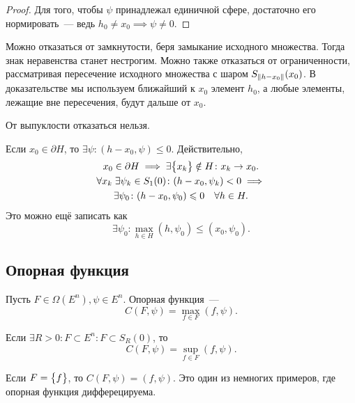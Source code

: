 \begin{proof}
    Для того, чтобы $\psi$ принадлежал единичной сфере, достаточно его нормировать~--- ведь $h_0 \neq x_0 \implies \psi \neq 0$.
\end{proof}

Можно отказаться от замкнутости, беря замыкание исходного множества.
Тогда знак неравенства станет нестрогим.
Можно также отказаться от ограниченности, рассматривая пересечение исходного множества с шаром $S_{\lVert h - x_0 \rVert}(x_0)$.
В доказательстве мы используем ближайший к $x_0$ элемент $h_0$, а любые элементы, лежащие вне пересечения, будут дальше от $x_0$.

От выпуклости отказаться нельзя.

Если $x_0 \in \partial H$, то $\exists \psi\colon (h - x_0, \psi) \leqslant 0$.
Действительно,
\begin{gather*}
    x_0 \in \partial H \implies \exists \bigl\{ x_k \bigr\} \notin H\colon x_k \to x_0. \\
    \forall x_k \; \exists \psi_k \in S_{1}(0)\colon (h - x_0, \psi_k) < 0 \implies \\
    \exists \psi_0\colon (h - x_0, \psi_0) \leqslant 0 \quad \forall h \in H.
\end{gather*}
Это можно ещё записать как
\begin{equation*}
    \exists \psi_0\colon \max\limits_{h \in H}(h, \psi_0) \leqslant (x_0, \psi_0).
\end{equation*}

\subsection{Опорная функция}
\begin{defn}
    Пусть $F \in \Omega(E^n), \psi \in E^n$.
    Опорная функция~---
    \begin{equation}
        C(F, \psi) = \max\limits_{f \in F}(f, \psi).
    \end{equation}

    Если $\exists R > 0\colon F \subset E^n\colon F \subset S_R(0)$, то
    \begin{equation*}
        C(F, \psi) = \sup\limits_{f \in F}(f, \psi).
    \end{equation*}
\end{defn}

\begin{exmp}
    Если $F = \bigl\{ f \bigr\}$, то $C(F, \psi) = (f, \psi)$.
    Это один из немногих примеров, где опорная функция дифферецируема.
\end{exmp}


